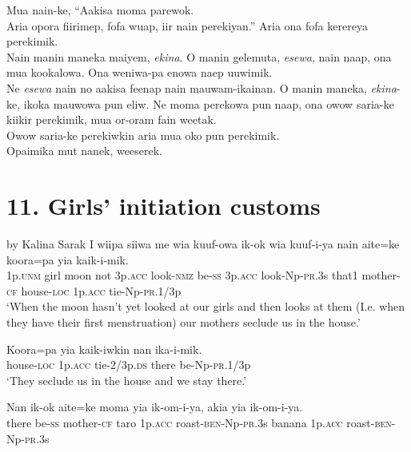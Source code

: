 Mua nain-ke,  “Aakisa moma parewok. \\
\textrm{Aria opora fiirimep,  fofa wuap,  iir nain perekiyan.” }
Aria ona fofa kerereya  perekimik. \\
\textrm{Nain manin maneka maiyem, }\textrm{\textit{ekina}}\textrm{. }
\textrm{O manin gelemuta, }\textrm{\textit{esewa}}\textrm{, nain naap,  ona mua kookalowa. }
Ona weniwa-pa enowa naep uuwimik. \\
\textrm{Ne }\textrm{\textit{esewa}}\textrm{ nain no aakisa feenap nain mauwam-ikainan. }
\textrm{O manin maneka, }\textrm{\textit{ekina}}\textrm{{}-ke, ikoka mauwowa pun eliw. }
Ne moma perekowa pun naap,  ona owow saria-ke kiikir perekimik,  mua or-oram fain weetak. \\
Owow saria-ke perekiwkin  aria mua oko pun perekimik. \\
Opaimika mut nanek, weeserek. \\
\section{ 11.  Girls’ initiation customs }
 by Kalina Sarak
\ea\label{ex:a:x1}
\gll  I  wiipa  siiwa  me  wia  kuuf-owa  ik-ok  wia  kuuf-i-ya          nain  aite=ke  koora=pa  yia  kaik-i-mik. \\
1p.\textsc{unm}  girl  moon  not  3p.\textsc{acc}  look-\textsc{nmz}  be-\textsc{ss}  3p.\textsc{acc}  look-Np-\textsc{pr}.3s  that1  mother-\textsc{cf}  house-\textsc{loc}  1p.\textsc{acc}  tie-Np-\textsc{pr}.1/3p \\


\glt ‘When the moon hasn’t yet looked at our girls and then looks at them (I.e. when they have their first menstruation) our mothers seclude us in the house.’ \\
\z


\ea\label{ex:a:x2}
\gll  Koora=pa  yia  kaik-iwkin  nan  ika-i-mik. \\
house-\textsc{loc}  1p.\textsc{acc}  tie-2/3p.\textsc{ds}  there  be-Np-\textsc{pr}.1/3p \\
\glt ‘They seclude us in the house and we stay there.’ \\
\z


\ea\label{ex:a:x3}
\gll  Nan  ik-ok  aite=ke  moma  yia  ik-om-i-ya,          akia  yia  ik-om-i-ya. \\
there  be-\textsc{ss}  mother-\textsc{cf}  taro  1p.\textsc{acc}  roast-\textsc{ben}-Np-\textsc{pr}.3s  banana  1p.\textsc{acc}  roast-\textsc{ben}-Np-\textsc{pr}.3s \\


